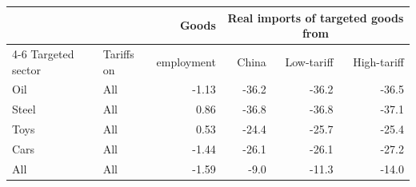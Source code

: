 \begin{tabular}{llrrrr}
\toprule
 & & Goods & \multicolumn{3}{c}{Real imports of targeted goods from} \\
\cmidrule(lr){4-6}
Targeted sector & Tariffs on & employment & China & Low-tariff & High-tariff \\
\midrule
Oil & All & -1.13 & -36.2 & -36.2 & -36.5 \\
\midrule
Steel & All & 0.86 & -36.8 & -36.8 & -37.1 \\
\midrule
Toys & All & 0.53 & -24.4 & -25.7 & -25.4 \\
\midrule
Cars & All & -1.44 & -26.1 & -26.1 & -27.2 \\
\midrule
All & All & -1.59 & -9.0 & -11.3 & -14.0 \\
\bottomrule
\end{tabular}
